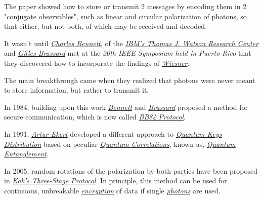 \documentclass[conference]{IEEEtran}
\begin{document}
The paper showed how to store or transmit 2 messages by encoding them in 2 "conjugate observables", such as linear and circular polarization of photons, so that either, but not both, of which may be received and decoded.

\vspace{4pt}

It wasn't until \href{https://en.wikipedia.org/wiki/Charles_H._Bennett_(computer_scientist)}{\textit{Charles Bennett}}, of the \href{http://research.ibm.com/labs/watson/}{\textit{IBM's Thomas J. Watson Research Center}} and \href{https://en.wikipedia.org/wiki/Gilles_Brassard}{\textit{Gilles Brassard}} met at the \textit{20th IEEE Symposium held in Puerto Rico} that they discovered how to incorporate the findings of \href{https://en.wikipedia.org/wiki/Stephen_Wiesner}{\textit{Wiesner}}.

\vspace{4pt}

The main breakthrough came when they realized that photons were never meant to store information, but rather to transmit it.

\vspace{4pt}

In 1984, building upon this work \href{https://en.wikipedia.org/wiki/Charles_H._Bennett_(computer_scientist)}{\textit{Bennett}} and \href{https://en.wikipedia.org/wiki/Gilles_Brassard}{\textit{Brassard}} proposed a method for secure communication, which is now called \href{https://en.wikipedia.org/wiki/BB84}{\textit{BB84 Protocol}}.

\vspace{4pt}

In 1991, \href{https://en.wikipedia.org/wiki/Artur_Ekert}{\textit{Artur Ekert}} developed a different approach to \href{https://en.wikipedia.org/wiki/Quantum_key_distribution}{\textit{Quantum Keys Distribution}} based on peculiar \href{https://en.wikipedia.org/wiki/Quantum_correlation}{\textit{Quantum Correlations}}, known as, \href{https://en.wikipedia.org/wiki/Quantum_entanglement}{\textit{Quantum Entanglement}}.

\vspace{4pt}

In 2005, random rotations of the polarization by both parties have been proposed in \href{https://en.wikipedia.org/wiki/Subhash_Kak}{\textit{Kak's Three-Stage Protocol}}. In principle, this method can be used for continuous, unbreakable \href{https://en.wikipedia.org/wiki/Encryption}{\textit{encryption}} of data if single \href{https://en.wikipedia.org/wiki/Photon}{\textit{photons}} are used.
\end{document}
